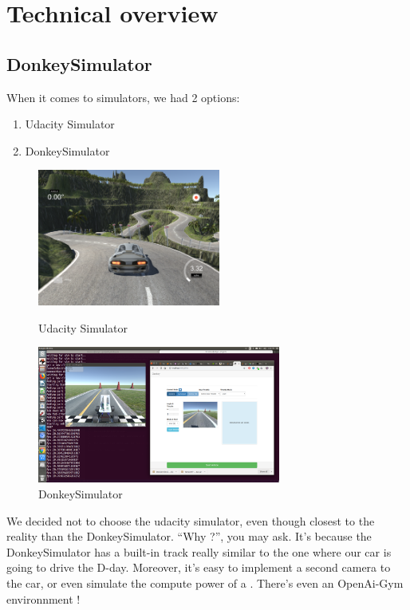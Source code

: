 \section{Technical overview}

\subsection{DonkeySimulator}

When it comes to simulators, we had 2 options: 
\begin{enumerate}
\item Udacity Simulator
\item DonkeySimulator
\end{enumerate}

\begin{figure}[!h]
\centering
\begin{minipage}[t]{6cm}
\includegraphics[width=6cm]{img/udacity_sim.png}
\caption{Udacity Simulator}
\end{minipage}
\hspace{1cm}
\begin{minipage}[t]{8cm}
\includegraphics[width=8cm]{img/donkey_sim.png}
\caption{DonkeySimulator}
\end{minipage}
\end{figure}

We decided not to choose the udacity simulator, even though closest to the reality than the DonkeySimulator. ``Why ?'', you may ask. It's because the DonkeySimulator has a built-in track really similar to the one where our car is going to drive the D-day. Moreover, it's easy to implement a second camera to the car, or even simulate the compute power of a . There's even an OpenAi-Gym environnment !


